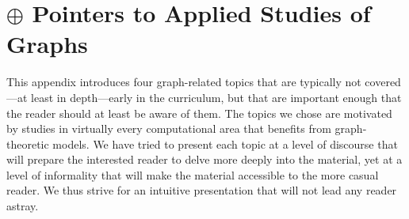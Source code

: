 
\chapter{$\oplus$ Pointers to Applied Studies of Graphs}
\label{ch:advanced-topics}

This appendix introduces four graph-related topics that are typically not covered---at least in depth---early in the curriculum, but that are important enough that the reader should at least be aware of them.  The topics we chose are motivated by studies in virtually every computational area that benefits from graph-theoretic models.  We have tried to present each topic at a level of discourse that will prepare the interested reader to delve more deeply into the material, yet at a level of informality that will make the material accessible to the more casual reader.  We thus strive for an intuitive presentation that will not lead any reader astray.

\smallskip

